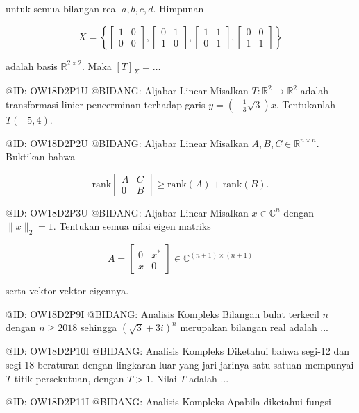 untuk semua bilangan real $a, b, c, d$. Himpunan 

$$
X = \left\{ \begin{bmatrix} 1 & 0 \\ 0 & 0 \end{bmatrix}, \begin{bmatrix} 0 & 1 \\ 1 & 0 \end{bmatrix}, \begin{bmatrix} 1 & 1 \\ 0 & 1 \end{bmatrix}, \begin{bmatrix} 0 & 0 \\ 1 & 1 \end{bmatrix} \right\}
$$

adalah basis $\mathbb{R}^{2 \times 2}$. Maka $[T]_X = \dots$

@ID: OW18D2P1U
@BIDANG: Aljabar Linear
Misalkan $T: \mathbb{R}^2 \to \mathbb{R}^2$ adalah transformasi linier pencerminan terhadap garis $y = \left(-\frac{1}{3}\sqrt{3}\right)x$. Tentukanlah $T(-5, 4)$.

@ID: OW18D2P2U
@BIDANG: Aljabar Linear
Misalkan $A, B, C \in \mathbb{R}^{n \times n}$. Buktikan bahwa 

$$
\text{rank}\begin{bmatrix} A & C \\ 0 & B \end{bmatrix} \ge \text{rank}(A) + \text{rank}(B).
$$

@ID: OW18D2P3U
@BIDANG: Aljabar Linear
Misalkan $x \in \mathbb{C}^n$ dengan $\|x\|_2 = 1$. Tentukan semua nilai eigen matriks 

$$
A = \begin{bmatrix} 0 & x^* \\ x & 0 \end{bmatrix} \in \mathbb{C}^{(n+1) \times (n+1)}
$$

serta vektor-vektor eigennya.

@ID: OW18D2P9I
@BIDANG: Analisis Kompleks
Bilangan bulat terkecil $n$ dengan $n \ge 2018$ sehingga $(\sqrt{3} + 3i)^n$ merupakan bilangan real adalah ...

@ID: OW18D2P10I
@BIDANG: Analisis Kompleks
Diketahui bahwa segi-12 dan segi-18 beraturan dengan lingkaran luar yang jari-jarinya satu satuan mempunyai $T$ titik persekutuan, dengan $T > 1$. Nilai $T$ adalah ...

@ID: OW18D2P11I
@BIDANG: Analisis Kompleks
Apabila diketahui fungsi 

